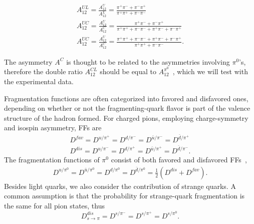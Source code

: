 \begin{equation}
\label{eqn:FF7}
\begin{aligned}
A_{12}^{UL}=\frac{A^{U}_{12}}{A^L_{12}}=\frac{\pi^+\pi^-+\pi^-\pi^+}{\pi^+\pi^++\pi^-\pi^-}\\
A_{12}^{UC}=\frac{A^{U}_{12}}{A^C_{12}}=\frac{\pi^+\pi^-+\pi^-\pi^+}{\pi^+\pi^++\pi^-\pi^-+\pi^+\pi^-+\pi^-\pi^+}\\
A_{12}^{UC}=\frac{A^{U}_{12}}{A^C_{12}}=\frac{\pi^+\pi^++\pi^-\pi^-+\pi^+\pi^-+\pi^-\pi^+}{\pi^+\pi^++\pi^-\pi^-}.
\end{aligned}
\end{equation}


The asymmetry $A^C$ is thought to be related to the asymmetries involving $\pi^0$'s, therefore the double ratio $A_{12}^{CL}$ should be equal to $A_{12}^{\pi^0}$~\cite{Efremov:2006qm}, 
which we will test with the experimental data.


Fragmentation functions are often categorized into favored and disfavored ones, depending on whether or not the fragmenting-quark flavor is part of the valence structure of the hadron formed. For charged pions, employing charge-symmetry and isospin asymmetry, FFs are 
\begin{equation}
\begin{aligned}
D^{fav}=D^{u/{\pi^+}}=D^{d/{\pi^-}}=D^{\bar{u}/{\pi^-}}=D^{\bar{d}/{\pi^+}}\\
D^{dis}=D^{u/{\pi^-}}=D^{d/{\pi^+}}=D^{\bar{u}/{\pi^+}}=D^{\bar{d}/{\pi^-}}.
\label{eqn:FF4}
\end{aligned}
\end{equation}
The fragmentation functions of $\pi^0$ consist of both favored and disfavored FFs~\cite{FoundationsofpQCD,Efremov:2006qm},
\begin{equation}
\begin{aligned}
D^{u/{\pi^0}}=D^{\bar{u}/{\pi^0}}=D^{d/{\pi^0}}=D^{\bar{d}/{\pi^0}}=\frac{1}{2}(D^{dis}+D^{fav}).
\label{eqn:FF4pi0}
\end{aligned}
\end{equation}
Besides light quarks, we also consider the contribution of strange quarks.
A common assumption is that the probability for strange-quark fragmentation is the same for all pion states, thus
\begin{equation}
D^{dis}_{s\rightarrow\pi}=D^{s/{\pi^-}}=D^{s/{\pi^+}}=D^{s/{\pi^0}}.
\end{equation}

